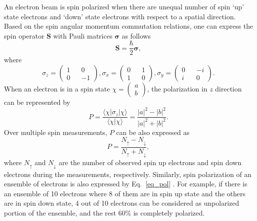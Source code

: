 An electron beam is spin polarized when there are unequal number of spin `up' state electrons and `down' state electrons with respect to a spatial direction. Based on the spin angular momentum commutation relations, one can express the spin operator $\mathbf{S}$ with Pauli matrices $\boldsymbol{\sigma}$ as follows \cite{Kessler}
	\begin{equation}
		\mathbf{S} = \frac{\hbar}{2} \boldsymbol{\sigma},
	\end{equation}
	where
	\begin{equation}
		\sigma_z = 
		\begin{pmatrix}
		1 && 0 \\
		0 && -1
		\end{pmatrix}, 
		\sigma_x =
		\begin{pmatrix}
		0 && 1 \\
		1 && 0
		\end{pmatrix}, 
		\sigma_y = 
		\begin{pmatrix}
		0 && -i \\
		i && 0
		\end{pmatrix}.		
	\end{equation}
	When an electron is in a spin state $\chi = \begin{pmatrix}
	a \\ b
	\end{pmatrix}$, the polarization in $z$ direction can be represented by
	\begin{equation}
		P = \frac{\langle \chi |\sigma_z | \chi \rangle}{\langle \chi | \chi \rangle}
		= \frac{|a|^2 - |b|^2}{|a|^2 + |b|^2}.
	\end{equation}
	Over multiple spin measurements, $P$ can be also expressed as
	\begin{equation}
		P = \frac{N_{\uparrow}-N_{\downarrow}}{N_{\uparrow}+N_{\downarrow}},
		\label{eq_pol}
	\end{equation}
	where $N_{\uparrow}$ and $N_{\downarrow}$ are the number of observed spin up electrons and spin down electrons  during the measurements, respectively. Similarly, spin polarization of an ensemble of electrons is also expressed by Eq.~\ref{eq_pol} \cite{Kessler}. For example, if there is an ensemble of 10 electrons where 8 of them are in spin up state and the others are in spin down state, 4 out of 10 electrons can be considered as unpolarized portion of the ensemble, and the rest 60\% is completely polarized.

